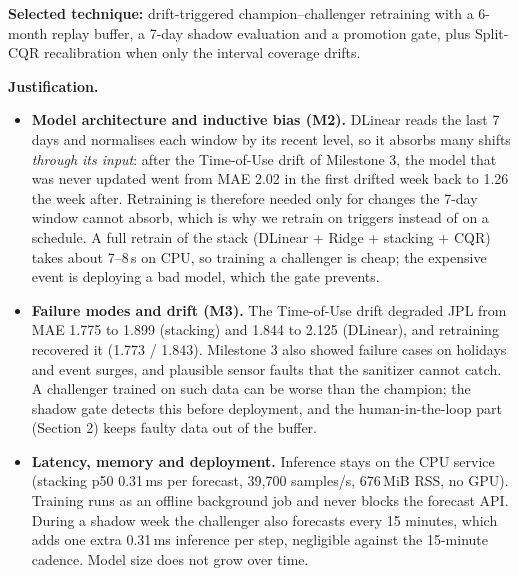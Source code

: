 \documentclass[11pt,letterpaper]{article}
\begin{document}
\textbf{Selected technique:} drift-triggered champion--challenger retraining with a 6-month replay buffer,
a 7-day shadow evaluation and a promotion gate, plus Split-CQR recalibration when only the interval coverage drifts.

\textbf{Justification.}
\begin{itemize}
  \item \textbf{Model architecture and inductive bias (M2).} DLinear reads the last 7 days and normalises each window by
  its recent level, so it absorbs many shifts \emph{through its input}: after the Time-of-Use drift of Milestone 3, the
  model that was never updated went from MAE 2.02 in the first drifted week back to 1.26 the week after. Retraining is
  therefore needed only for changes the 7-day window cannot absorb, which is why we retrain on triggers instead of on a
  schedule. A full retrain of the stack (DLinear + Ridge + stacking + CQR) takes about 7--8\,s on CPU, so training a
  challenger is cheap; the expensive event is deploying a bad model, which the gate prevents.
  \item \textbf{Failure modes and drift (M3).} The Time-of-Use drift degraded JPL from MAE 1.775 to 1.899 (stacking)
  and 1.844 to 2.125 (DLinear), and retraining recovered it (1.773 / 1.843). Milestone 3 also showed failure cases on
  holidays and event surges, and plausible sensor faults that the sanitizer cannot catch. A challenger trained on such
  data can be worse than the champion; the shadow gate detects this before deployment, and the human-in-the-loop part
  (Section 2) keeps faulty data out of the buffer.
  \item \textbf{Latency, memory and deployment.} Inference stays on the CPU service (stacking p50 0.31\,ms per forecast,
  39{,}700 samples/s, 676\,MiB RSS, no GPU). Training runs as an offline background job and never blocks the forecast
  API. During a shadow week the challenger also forecasts every 15 minutes, which adds one extra 0.31\,ms inference per
  step, negligible against the 15-minute cadence. Model size does not grow over time.
\end{itemize}
\end{document}
